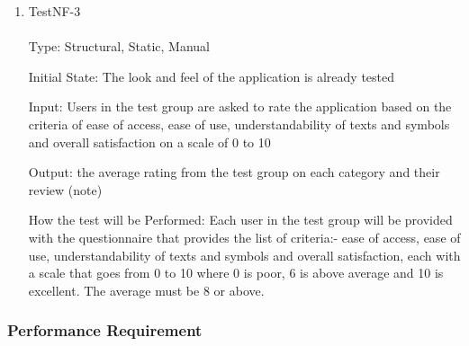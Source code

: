 \documentclass[12pt, titlepage]{article}
\begin{document}
\begin{enumerate}

\item{TestNF-3\\\\}
Type: Structural, Static, Manual

Initial State: The look and feel of the application is already tested

Input: Users in the test group are asked to rate the application based on the criteria of ease of access, ease of use, understandability of texts and symbols and overall satisfaction on a scale of 0 to 10  

Output: the average rating from the test group on each category and their review (note)

How the test will be Performed: Each user in the test group will be provided with the questionnaire that provides the list of criteria:- ease of access, ease of use, understandability of texts and symbols and overall satisfaction, each with a scale that goes from 0 to 10 where 0 is poor, 6 is above average and 10 is excellent. The average must be 8 or above.
\end{enumerate}

\subsubsection{Performance Requirement}
		
\end{document}
